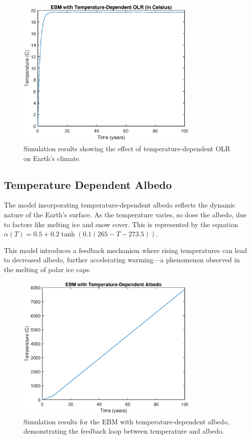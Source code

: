 \documentclass[12pt]{article}
\begin{document}
\begin{figure}[ht]
\centering
\includegraphics[width=0.8\textwidth]{temperature_dependent_OLR.eps}
\caption{Simulation results showing the effect of temperature-dependent OLR on Earth's climate.}
\label{fig:tempDepOLR}
\end{figure}

\subsection{Temperature Dependent Albedo}
The model incorporating temperature-dependent albedo 
reflects the dynamic nature of the Earth's surface. 
As the temperature varies, so does the albedo, 
due to factors like melting ice and snow cover. 
This is represented by the equation 
\( \alpha(T) = 0.5 + 0.2 \tanh(0.1(265 - T - 273.5)) \).

This model introduces a feedback mechanism 
where rising temperatures can lead to decreased albedo, 
further accelerating warming—a phenomenon observed 
in the melting of polar ice caps. 

\begin{figure}[ht]
\centering
\includegraphics[width=0.8\textwidth]{temperature_dependent_albedo.eps}
\caption{Simulation results for the EBM with temperature-dependent albedo, demonstrating the feedback loop between temperature and albedo.}
\label{fig:tempDepAlbedo}
\end{figure}
\end{document}
